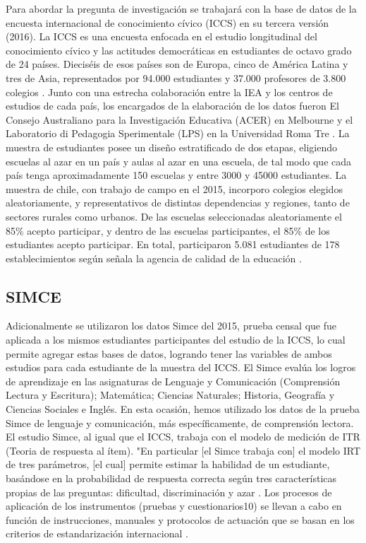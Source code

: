 \documentclass[12pt,twoside]{templates/facsothesis}
\begin{document}
Para abordar la pregunta de investigación se trabajará con la base de datos de la encuesta internacional de conocimiento cívico (ICCS) en su tercera versión (2016). La ICCS es una encuesta enfocada en el estudio longitudinal del conocimiento cívico y las actitudes democráticas en estudiantes de octavo grado de 24 países. Dieciséis de esos países son de Europa, cinco de América Latina y tres de Asia, representados por 94.000 estudiantes y 37.000 profesores de 3.800 colegios \citep{schulz_ICCS_2016}. Junto con una estrecha colaboración entre la IEA y los centros de estudios de cada país, los encargados de la elaboración de los datos fueron El Consejo Australiano para la Investigación Educativa (ACER) en Melbourne y el Laboratorio di Pedagogia Sperimentale (LPS) en la Universidad Roma Tre \citep{iea_International_2016}. La muestra de estudiantes posee un diseño estratificado de dos etapas, eligiendo escuelas al azar en un país y aulas al azar en una escuela, de tal modo que cada país tenga aproximadamente 150 escuelas y entre 3000 y 45000 estudiantes. La muestra de chile, con trabajo de campo en el 2015, incorporo colegios elegidos aleatoriamente, y representativos de distintas dependencias y regiones, tanto de sectores rurales como urbanos. De las escuelas seleccionadas aleatoriamente el 85\% acepto participar, y dentro de las escuelas participantes, el 85\% de los estudiantes acepto participar. En total, participaron 5.081 estudiantes de 178 establecimientos según señala la agencia de calidad de la educación \citep{ace_Informe_2018a}.

\hypertarget{simce}{%
\subsection{SIMCE}\label{simce}}

Adicionalmente se utilizaron los datos Simce del 2015, prueba censal que fue aplicada a los mismos estudiantes participantes del estudio de la ICCS, lo cual permite agregar estas bases de datos, logrando tener las variables de ambos estudios para cada estudiante de la muestra del ICCS. El Simce evalúa los logros de aprendizaje en las asignaturas de Lenguaje y Comunicación (Comprensión Lectura y Escritura); Matemática; Ciencias Naturales; Historia, Geografía y Ciencias Sociales e Inglés. En esta ocasión, hemos utilizado los datos de la prueba Simce de lenguaje y comunicación, más específicamente, de comprensión lectora. El estudio Simce, al igual que el ICCS, trabaja con el modelo de medición de ITR (Teoria de respuesta al ítem). "En particular {[}el Simce trabaja con{]} el modelo IRT de tres parámetros, {[}el cual{]} permite estimar la habilidad de un estudiante, basándose en la probabilidad de respuesta correcta según tres características propias de las preguntas: dificultad, discriminación y azar \citep{ace_Informe_2018}. Los procesos de aplicación de los instrumentos (pruebas y cuestionarios10) se llevan a cabo en función de instrucciones, manuales y protocolos de actuación que se basan en los criterios de estandarización internacional \citep{aera_Report_2011}.
\end{document}
